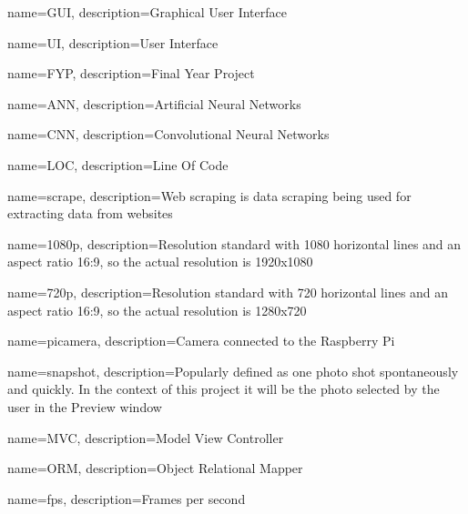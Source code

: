 {
        name=GUI,
        description={Graphical User Interface}
}

{
        name=UI,
        description={User Interface}
}

{
        name=FYP,
        description={Final Year Project}
}

{
        name=ANN,
        description={Artificial Neural Networks}
}

{
        name=CNN,
        description={Convolutional Neural Networks}
}

{
        name=LOC,
        description={Line Of Code}
}

{
        name=scrape,
        description={Web scraping is data scraping being used for extracting data from websites}
}

{
        name=1080p,
        description={Resolution standard with 1080 horizontal lines and an aspect ratio 16:9, so the actual resolution is 1920x1080}
}

{
        name=720p,
        description={Resolution standard with 720 horizontal lines and an aspect ratio 16:9, so the actual resolution is 1280x720}
}

{
        name=picamera,
        description={Camera connected to the Raspberry Pi}
}

{
        name=snapshot,
        description={Popularly defined as one photo shot spontaneously and quickly. In the context of this project it will be the photo selected by the user in the Preview window}
}

{
        name=MVC,
        description={Model View Controller}
}

{
        name=ORM,
        description={Object Relational Mapper}
}

{
        name=fps,
        description={Frames per second}
}

% 
